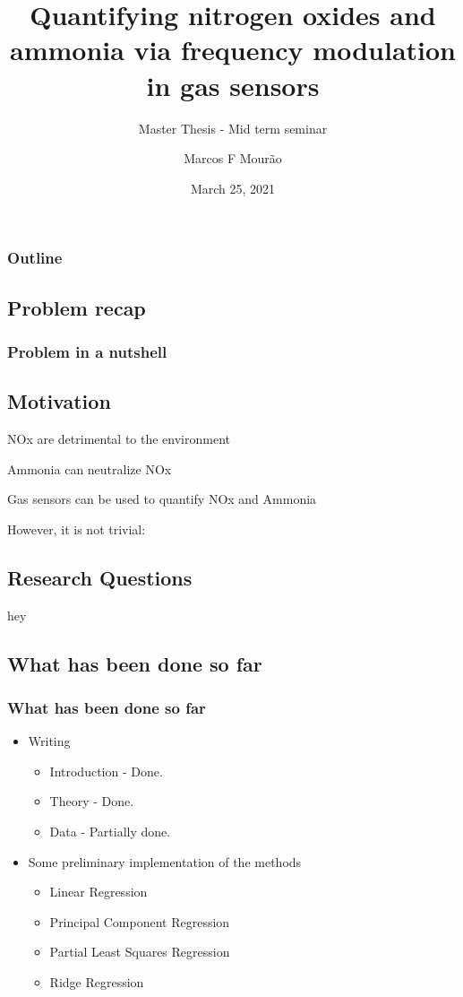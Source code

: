 \documentclass{beamer}
\title{Quantifying nitrogen oxides and ammonia via frequency modulation in gas sensors}
\subtitle{Master Thesis - Mid term seminar}
\author{Marcos F Mourão}
\date{March 25, 2021}
\begin{document}
	\begin{frame}
		\titlepage
	\end{frame}

\begin{frame}
	\frametitle{Outline}
	\tableofcontents
\end{frame}

\begin{frame}
	\section{Problem recap}
	\frametitle{Problem in a nutshell}
	
	\subsection{Motivation}
	NOx are detrimental to the environment
	
	Ammonia can neutralize NOx
	
	Gas sensors can be used to quantify NOx and Ammonia
	
	However, it is not trivial:
	
	\subsection{Research Questions}
	
	hey
\end{frame}

\begin{frame}
	\section{What has been done so far}
	\frametitle{What has been done so far}
	
	\begin{itemize}
		\item Writing
		\begin{itemize}
			\item Introduction - Done.
			\item Theory - Done.
			\item Data - Partially done.
		\end{itemize}
		\item Some preliminary implementation of the methods
		\begin{itemize}
			\item Linear Regression
			\item Principal Component Regression
			\item Partial Least Squares Regression
			\item Ridge Regression
		\end{itemize}
	\end{itemize}
	
\end{frame}
\end{document}
